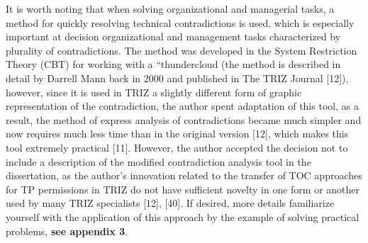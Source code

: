 \documentclass[11pt,a4paper]{book}
\begin{document}
It is worth noting that when solving organizational and managerial tasks, a
method for quickly resolving technical contradictions is used, which is
especially important at decision organizational and management tasks
characterized by plurality of contradictions. The method was developed in the
System Restriction Theory (CBT) for working with a “thundercloud (the method
is described in detail by Darrell Mann back in 2000 and published in The TRIZ
Journal [12]), however, since it is used in TRIZ a slightly different form of
graphic representation of the contradiction, the author spent adaptation of
this tool, as a result, the method of express analysis of contradictions
became much simpler and now requires much less time than in the original
version [12], which makes this tool extremely practical [11]. However, the
author accepted the decision not to include a description of the modified
contradiction analysis tool in the dissertation, as the author’s innovation
related to the transfer of TOC approaches for TP permissions in TRIZ do not
have sufficient novelty in one form or another used by many TRIZ specialists
[12], [40]. If desired, more details familiarize yourself with the application
of this approach by the example of solving practical problems, \textbf{see
  appendix 3}.
\end{document}
